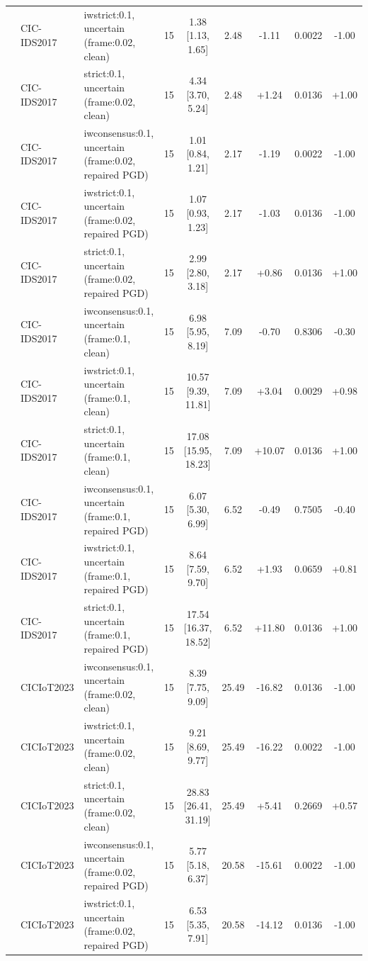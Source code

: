 \begin{table}[t]
\begin{tabular}{lllcccccc}
 & CIC-IDS2017 & iwstrict:0.1, uncertain (frame:0.02, clean) & 15 & 1.38 [1.13, 1.65] & 2.48 & -1.11 & 0.0022 & -1.00 \\
 & CIC-IDS2017 & strict:0.1, uncertain (frame:0.02, clean) & 15 & 4.34 [3.70, 5.24] & 2.48 & +1.24 & 0.0136 & +1.00 \\
 & CIC-IDS2017 & iwconsensus:0.1, uncertain (frame:0.02, repaired PGD) & 15 & 1.01 [0.84, 1.21] & 2.17 & -1.19 & 0.0022 & -1.00 \\
 & CIC-IDS2017 & iwstrict:0.1, uncertain (frame:0.02, repaired PGD) & 15 & 1.07 [0.93, 1.23] & 2.17 & -1.03 & 0.0136 & -1.00 \\
 & CIC-IDS2017 & strict:0.1, uncertain (frame:0.02, repaired PGD) & 15 & 2.99 [2.80, 3.18] & 2.17 & +0.86 & 0.0136 & +1.00 \\
 & CIC-IDS2017 & iwconsensus:0.1, uncertain (frame:0.1, clean) & 15 & 6.98 [5.95, 8.19] & 7.09 & -0.70 & 0.8306 & -0.30 \\
 & CIC-IDS2017 & iwstrict:0.1, uncertain (frame:0.1, clean) & 15 & 10.57 [9.39, 11.81] & 7.09 & +3.04 & 0.0029 & +0.98 \\
 & CIC-IDS2017 & strict:0.1, uncertain (frame:0.1, clean) & 15 & 17.08 [15.95, 18.23] & 7.09 & +10.07 & 0.0136 & +1.00 \\
 & CIC-IDS2017 & iwconsensus:0.1, uncertain (frame:0.1, repaired PGD) & 15 & 6.07 [5.30, 6.99] & 6.52 & -0.49 & 0.7505 & -0.40 \\
 & CIC-IDS2017 & iwstrict:0.1, uncertain (frame:0.1, repaired PGD) & 15 & 8.64 [7.59, 9.70] & 6.52 & +1.93 & 0.0659 & +0.81 \\
 & CIC-IDS2017 & strict:0.1, uncertain (frame:0.1, repaired PGD) & 15 & 17.54 [16.37, 18.52] & 6.52 & +11.80 & 0.0136 & +1.00 \\
 & CICIoT2023 & iwconsensus:0.1, uncertain (frame:0.02, clean) & 15 & 8.39 [7.75, 9.09] & 25.49 & -16.82 & 0.0136 & -1.00 \\
 & CICIoT2023 & iwstrict:0.1, uncertain (frame:0.02, clean) & 15 & 9.21 [8.69, 9.77] & 25.49 & -16.22 & 0.0022 & -1.00 \\
 & CICIoT2023 & strict:0.1, uncertain (frame:0.02, clean) & 15 & 28.83 [26.41, 31.19] & 25.49 & +5.41 & 0.2669 & +0.57 \\
 & CICIoT2023 & iwconsensus:0.1, uncertain (frame:0.02, repaired PGD) & 15 & 5.77 [5.18, 6.37] & 20.58 & -15.61 & 0.0022 & -1.00 \\
 & CICIoT2023 & iwstrict:0.1, uncertain (frame:0.02, repaired PGD) & 15 & 6.53 [5.35, 7.91] & 20.58 & -14.12 & 0.0136 & -1.00 \\

\end{tabular}
\end{table}
